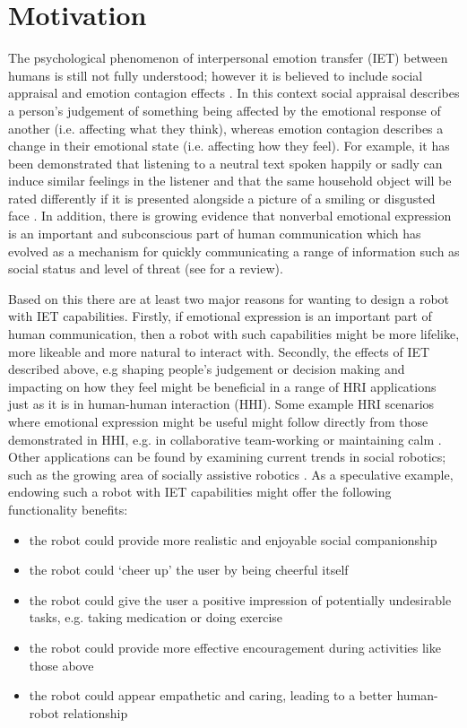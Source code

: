 \documentclass[11pt]{article}
\begin{document}
\section{Motivation}
The psychological phenomenon of interpersonal emotion transfer (IET) between humans is still not fully understood; however it is believed to include social appraisal and emotion contagion effects \cite{parkinson2011interpersonal}. In this context social appraisal describes a person's judgement of something being affected by the emotional response of another (i.e. affecting what they think), whereas emotion contagion describes a change in their emotional state (i.e. affecting how they feel). For example, it has been demonstrated that listening to a neutral text spoken happily or sadly can induce similar feelings in the listener \cite{neumann2000mood} and that the same household object will be rated differently if it is presented alongside a picture of a smiling or disgusted face \cite{bayliss2007affective}. In addition, there is growing evidence that nonverbal emotional expression is an important and subconscious part of human communication which has evolved as a mechanism for quickly communicating a range of information such as social status and level of threat (see \cite{tracy2015nonverbal} for a review). 

Based on this there are at least two major reasons for wanting to design a robot with IET capabilities. Firstly, if emotional expression is an important part of human communication, then a robot with such capabilities might be more lifelike, more likeable and more natural to interact with. Secondly, the effects of IET described above, e.g shaping people's judgement or decision making and impacting on how they feel might be beneficial in a range of HRI applications just as it is in human-human interaction (HHI). Some example HRI scenarios where emotional expression might be useful might follow directly from those demonstrated in HHI, e.g. in collaborative team-working \cite{barsade2002ripple} or maintaining calm \cite{latane1968group}. Other applications can be found by examining current trends in social robotics; such as the growing area of socially assistive robotics \cite{feil2005defining}. As a speculative example, endowing such a robot with IET  capabilities might offer the following functionality benefits: 
\begin{itemize}
\item the robot could provide more realistic and enjoyable social companionship
\item the robot could `cheer up' the user by being cheerful itself
\item the robot could give the user a positive impression of potentially undesirable tasks, e.g. taking medication or doing exercise
\item the robot could provide more effective encouragement during activities like those above
\item the robot could appear empathetic and caring, leading to a better human-robot relationship
\end{itemize}
\end{document}

